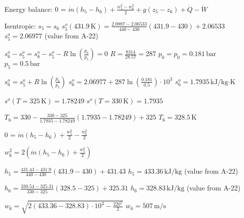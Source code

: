 Energy balance:  
0 = \( \dot{m} (h_5 - h_6) + \frac{w_5^2 - w_6^2}{2} + g(z_5 - z_6) + \dot{Q} - \dot{W} \)  

Isentropic:  
\( s_5 = s_6 \)  
\( s_5^o (431.9 \, \text{K}) = \frac{2.0887 - 2.06533}{440 - 430} (431.9 - 430) + 2.06533 \)  
\( s_5^o = 2.06977 \) (value from A-22)  

\( s_6^o - s_5^o = s_6^o - s_5^o - R \ln \left(\frac{p_6}{p_5}\right) = 0 \)  
\( R = \frac{8314}{28.57} = 287 \)  
\( p_0 = p_0 = 0.181 \, \text{bar} \)  
\( p_5 = 0.5 \, \text{bar} \)  

\( s_6^o = s_5^o + R \ln \left(\frac{p_6}{p_5}\right) \)  
\( s_6^o = 2.06977 + 287 \ln \left(\frac{0.181}{0.5}\right) \cdot 10^3 \)  
\( s_6^o = 1.7935 \, \text{kJ/kg·K} \)  

\( s^o (T = 325 \, \text{K}) = 1.78249 \)  
\( s^o (T = 330 \, \text{K}) = 1.7935 \)  

\( T_6 = 330 - \frac{330 - 325}{1.7935 - 1.78249} (1.7935 - 1.78249) + 325 \)  
\( T_6 = 328.5 \, \text{K} \)  

0 = \( \dot{m} (h_5 - h_6) + \frac{w_5^2}{2} - \frac{w_6^2}{2} \)  

\( w_6^2 = 2 \left(\dot{m} (h_5 - h_6) + \frac{w_5^2}{2}\right) \)  

\( h_5 = \frac{431.43 - 431.9}{440 - 430} (431.9 - 430) + 431.43 \)  
\( h_5 = 433.36 \, \text{kJ/kg} \) (value from A-22)  

\( h_6 = \frac{330.54 - 325.31}{330 - 325} (328.5 - 325) + 325.31 \)  
\( h_6 = 328.83 \, \text{kJ/kg} \) (value from A-22)  

\( w_6 = \sqrt{2 \left(433.36 - 328.83 \right) \cdot 10^3 - \frac{220^2}{2}} \)  
\( w_6 = 507 \, \text{m/s} \)